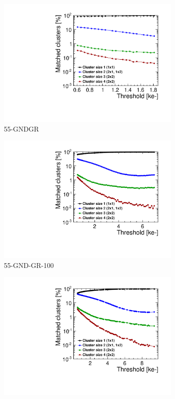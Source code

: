 \begin{figure}[htbp]
  \begin{subfigure}[b]{0.33\textwidth}
    \includegraphics[width=\textwidth]{./figures/TestBeam/cluSize_THLscan_W0019_C07.pdf}
    \caption{55-GNDGR}
  \end{subfigure} \hfill
  \begin{subfigure}[b]{0.33\textwidth}
    \includegraphics[width=\textwidth]{./figures/TestBeam/cluSize_THLscan_W0005_E02.pdf}
    \caption{55-GND-GR-100}
  \end{subfigure}\hfill
  \begin{subfigure}[b]{0.33\textwidth}
    \includegraphics[width=\textwidth]{./figures/TestBeam/cluSize_THLscan_W0005_F01.pdf}

\end{subfigure}
\end{figure}
